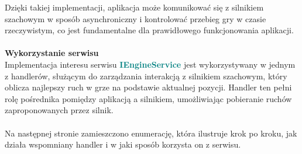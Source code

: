 \documentclass[12pt,a4paper]{article}
\begin{document}
\noindent
Dzięki takiej implementacji, aplikacja może komunikować się z silnikiem szachowym w sposób asynchroniczny i kontrolować przebieg gry w czasie rzeczywistym, co jest fundamentalne dla prawidłowego funkcjonowania aplikacji.
\\\\

\noindent \textbf{Wykorzystanie serwisu}\\
Implementacja interesu serwisu \textcolor{teal}{\textbf{IEngineService}} jest wykorzystywany w jednym z handlerów, służącym do zarządzania interakcją z silnikiem szachowym, który oblicza najlepszy ruch w grze na podstawie aktualnej pozycji. Handler ten pełni rolę pośrednika pomiędzy aplikacją a silnikiem, umożliwiając pobieranie ruchów zaproponowanych przez silnik.
\\\\
Na następnej stronie zamieszczono enumerację, która ilustruje krok po kroku, jak działa wspomniany handler i w jaki sposób korzysta on z serwisu.

\newpage
\end{document}

